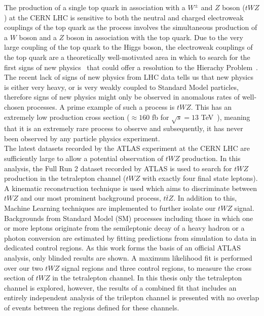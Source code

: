 The production of a single top quark in association with a $W^{\pm}$ and $Z$ boson ($tWZ$) at the CERN LHC is sensitive to both the neutral and charged electroweak couplings of the top quark as the process involves the simultaneous production of a $W$ boson and a $Z$ boson in association with the top quark. Due to the very large coupling of the top quark to the Higgs boson, the electroweak couplings of the top quark are a theoretically well-motivated area in which to search for the first signs of new physics~\cite{TopQuarkCouplings-searchNewPhysics, top-a-tool-for-disc} that could offer a resolution to the Hierachy Problem~\cite{hierarchy-problem-paper, Burdman_2015}. The recent lack of signs of new physics from LHC data tells us that new physics is either very heavy, or is very weakly coupled to Standard Model particles, therefore signs of new physics might only be observed in anomalous rates of well-chosen processes. A prime example of such a process is $tWZ$. This has an extremely low production cross section ($\approx 160$ fb for $\sqrt{s}=13$ TeV~\cite{twz-theory-paper}), meaning that it is an extremely rare process to observe and subsequently, it has never been observed by any particle physics experiment.\\

\noindent
The latest datasets recorded by the ATLAS experiment at the CERN LHC are sufficiently large to allow a potential observation of $tWZ$ production. In this analysis, the Full Run 2 dataset recorded by ATLAS is used to search for $tWZ$ production in the tetralepton channel ($tWZ$ with exactly four final state leptons). A kinematic reconstruction technique is used which aims to discriminate between $tWZ$ and our most prominent background process, $t\bar{t}Z$. In addition to this, Machine Learning techniques are implemented to further isolate our $tWZ$ signal. Backgrounds from Standard Model (SM) processes including those in which one or more leptons originate from the semileptonic decay of a heavy hadron or a photon conversion are estimated by fitting predictions from simulation to data in dedicated control regions. As this work forms the basis of an official ATLAS analysis, only blinded results are shown. A maximum likelihood fit is performed over our two $tWZ$ signal regions and three control regions, to measure the cross section of $tWZ$ in the tetralepton channel. In this thesis only the tetralepton channel is explored, however, the results of a combined fit that includes an entirely independent analysis of the trilepton channel is presented with no overlap of events between the regions defined for these channels. 
